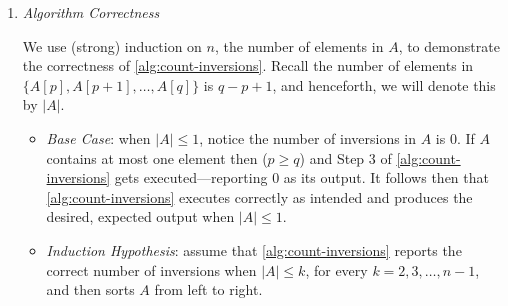 \documentclass[10pt, letterpaper]{article}
\begin{document}
\begin{enumerate}[label={\bfseries Q\arabic*.}]
\begin{enumerate}
\begin{enumerate}[label={\arabic*.}, leftmargin=*]
          \item
            {\itshape Algorithm Correctness} \\ \vspace{-3mm}

            We use (strong) induction on $n$, the number of elements in $A$, to demonstrate the correctness of
            \autoref{alg:count-inversions}. Recall the number of elements in $\{A[p], A[p+1], \ldots, A[q]\}$
            is $q - p + 1$, and henceforth, we will denote this by $|A|$. \\

            \begin{itemize}[itemsep=10pt]
              \item
                {\itshape Base Case}: when $|A| \leq 1$, notice the number of inversions in $A$ is $0$. If $A$
                contains at most one element then ($p \geq q$) and Step $3$ of \autoref{alg:count-inversions}
                gets executed---reporting $0$ as its output. It follows then that \autoref{alg:count-inversions}
                executes correctly as intended and produces the desired, expected output when $|A| \leq 1$.

              \item
                {\itshape Induction Hypothesis}: assume that \autoref{alg:count-inversions} reports the correct
                number of inversions when $|A| \leq k$, for every $k = 2, 3, \ldots, n-1$, and then sorts $A$
                from left to right.


\end{itemize}
\end{enumerate}
\end{enumerate}
\end{enumerate}
\end{document}
